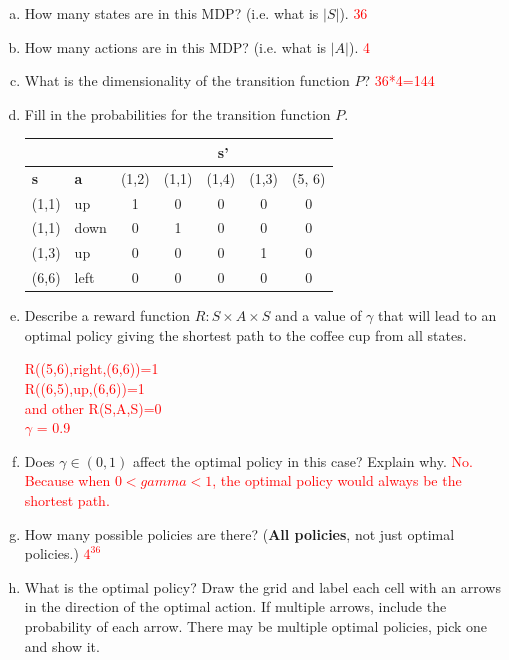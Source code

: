 \documentclass[12pt]{article}
\newcommand{\yl}[1]{\textcolor{red}{#1}}
\begin{document}
\begin{enumerate}[a)]
\item  How many states are in this MDP? (i.e. what is $|S|$). \yl{36}
\item How many actions are in this MDP? (i.e. what is $|A|$). \yl{4}
\item What is the dimensionality of the transition function $P$? \yl{36*4=144}
\item Fill in the probabilities for the transition function $P$.\\
  \begin{center}
    \begin{tabular}{|l|l|c|c|c|c|c|}\hline
      \multicolumn{2}{|c|}{} &
                               \multicolumn{5}{|c|}{\textbf{s'}}\\\hline
      \textbf{s} & \textbf{a} & (1,2) & (1,1) & (1,4) & (1,3) & (5, 6)\\\hline
      (1,1) & up & 1& 0& 0& 0&0\\ \hline
      (1,1) & down& 0& 1& 0&0&0\\ \hline
      (1,3) & up & 0& 0& 0& 1&0\\ \hline
      (6,6) & left & 0& 0& 0& 0&0\\ \hline
    \end{tabular}
  \end{center}

\item Describe a reward function $R : S \times A \times S$ 
  and a value of $\gamma$ that
  will lead to an optimal policy giving the shortest path to the coffee cup from
  all states.
  
  \yl{R((5,6),right,(6,6))=1\\
  R((6,5),up,(6,6))=1\\
 and other R(S,A,S)=0\\
 $\gamma$ = 0.9}
\item Does $\gamma \in (0, 1)$ affect the optimal policy in this case?
  Explain why.
  \yl{No. Because when $0 < gamma < 1$, the optimal policy would always be the shortest path. }
\item How many possible policies are there?  (\textbf{All policies},
  not just optimal policies.)
  \yl{$4^{36}$}
\item What is the optimal policy? Draw the grid and label each cell
  with an arrows in the direction of the optimal action. If multiple
  arrows, include the probability of each arrow. There may be
  multiple optimal policies, pick one and show it.
  

\end{enumerate}
\end{document}
